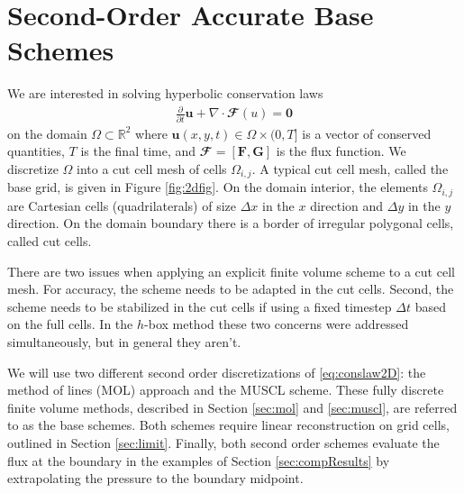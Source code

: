 \section{Second-Order Accurate Base Schemes}\label{sec:basefv}
We are interested in solving hyperbolic conservation laws 
\begin{equation}
\begin{aligned} \label{eq:conslaw2D}
\frac{\partial}{\partial t}	\mathbf{u} + \nabla \cdot \mathbfcal{F}(u)  = \mathbf{0}
\end{aligned}
\end{equation}
on the domain $\Omega \subset \mathbb{R}^2$ where $\mathbf{u}(x,y,t) \in \Omega \times (0,T]$ is a vector of conserved quantities, $T$ is the final time, and $\mathbfcal{F} = [\mathbf{F}, \mathbf{G}]$ is the flux function.  We discretize $\Omega$ into a cut cell mesh of cells $\Omega_{i,j}$.  A typical cut cell mesh, called the base grid, is given in Figure \ref{fig:2dfig}.  On the domain interior, the elements $\Omega_{i,j}$ are Cartesian cells (quadrilaterals) of size $\Delta x$ in the $x$ direction and $\Delta y$ in the $y$ direction.  On the domain boundary there is a border of irregular polygonal cells, called cut cells.  



There are two issues when applying an explicit finite volume scheme to a cut cell
mesh.  For accuracy, the scheme needs to be adapted in the cut cells. Second, 
the scheme needs to be stabilized in the cut cells if using a fixed timestep $\Delta t$ 
based on the full cells. In the $h$-box method these two concerns were addressed
simultaneously, but in general they aren't.

We will use two different second order discretizations of \eqref{eq:conslaw2D}: the method of lines
(MOL) approach and the MUSCL scheme.
These fully discrete finite volume methods, described in Section \ref{sec:mol} and \ref{sec:muscl},
are referred to as the base schemes.  Both schemes require linear 
reconstruction on grid cells,
outlined in Section \ref{sec:limit}.  
Finally, both second order schemes evaluate the flux at
the boundary in the examples of Section \ref{sec:compResults} by extrapolating the
pressure to the boundary midpoint. 

